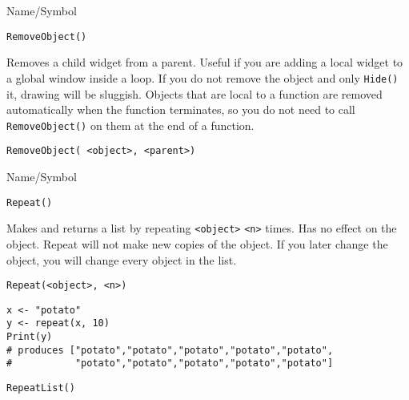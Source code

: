 \begin{desc}{Name/Symbol}
\item[Name/Symbol]	\verb+RemoveObject()+

\item[Description] Removes a child widget from a parent.  Useful if
  you are adding a local widget to a global window inside a loop.  If
  you do not remove the object and only \verb+Hide()+ it, drawing will
  be sluggish.  Objects that are local to a function are removed
  automatically when the function terminates, so you do not need to
  call \verb+RemoveObject()+ on them at the end of a function.

\item[Usage]
\begin{verbatim}
RemoveObject( <object>, <parent>)
\end{verbatim}

\item[Example]	

\item[See Also]	
\end{desc}

\rl


\begin{desc}{Name/Symbol}
\item[Name/Symbol] 	\verb+Repeat()+

\item[Description] 	Makes and returns a list by repeating \verb+<object>+ \verb+<n>+ times. 
		Has no effect on the object. Repeat will not make new copies 
		of the object. If you later change the object, 
		you will change every object in the list.

\item[Usage]       	
\begin{verbatim}
Repeat(<object>, <n>)
\end{verbatim}
	    	
\item[Example]     	
\begin{verbatim}
x <- "potato"
y <- repeat(x, 10)
Print(y)
# produces ["potato","potato","potato","potato","potato", 
#           "potato","potato","potato","potato","potato"]
\end{verbatim}
	     	     
\item[See Also]    	\verb+RepeatList()+
\end{desc}

\rl


